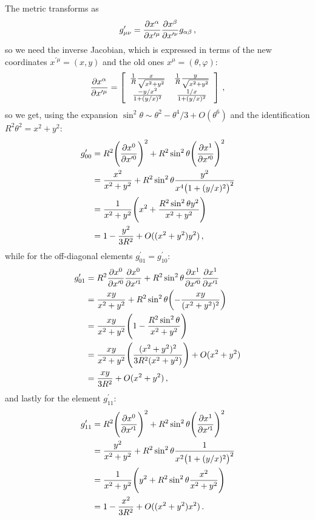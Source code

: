 \documentclass[main.tex]{subfiles}
\begin{document}
The metric transforms as 
%
\begin{align}
  g_{\mu \nu }^{\prime } 
  = \pdv{x^{\alpha }}{x^{\prime \mu }}
  \pdv{x^{\beta }}{x^{\prime  \nu }}
  g_{\alpha \beta }
\,,
\end{align}
%
so we need the inverse Jacobian, which is expressed in terms of the new coordinates \(x^{\prime \mu } = (x, y)\) and the old ones \(x^{\mu } = (\theta , \varphi )\):
%
\begin{align}
  \pdv{x^{\alpha }}{x^{\prime \mu }}
  = \left[\begin{array}{cc}
  \frac{1}{R} \frac{x}{\sqrt{x^2 + y^2}} & 
  \frac{1}{R} \frac{y}{\sqrt{x^2 + y^2}} \\ 
  \frac{-y / x^2}{1 + (y/x)^2} & 
  \frac{1/x}{1 + (y/x)^2}
  \end{array}\right]
\,,
\end{align}
%
so we get, using the expansion \(\sin^2\theta \sim \theta^2 - \theta^{4} /3 + O (\theta^{6})\) and the identification \(R^2\theta^2 = x^2+y^2\):
%
\begin{subequations}
\begin{align}
  g_{00}^{\prime } &= R^2 \qty(\pdv{x^{0}}{x^{\prime 0}})^2
  + R^2 \sin^2 \theta \qty(\pdv{x^{1}}{x^{\prime 0}})^2  \\
  &= \frac{x^2}{x^2+y^2} + R^2 \sin^2 \theta \frac{y^2}{x^{4} \qty(1 + (y/x)^2)^2}  \\
  &=\frac{1}{x^2+y^2} \qty(x^2 + \frac{R^2 \sin^2\theta y^2}{x^2+y^2})  \\
  &= 1 - \frac{y^2}{3R^2} + O((x^2+y^2)y^2)
\,,
\end{align}
\end{subequations}
%
while for the off-diagonal elements \(g_{01}^{\prime } = g_{10}^{\prime }\): 
%
\begin{subequations}
\begin{align}
  g_{01}^{\prime } &= R^2 \pdv{x^{0}}{x^{\prime 0}} \pdv{x^{0}}{x^{\prime 1}} 
  + R^2 \sin^2 \theta \pdv{x^{1}}{x^{\prime 0}} \pdv{x^{1}}{x^{\prime 1}}  \\
  &= \frac{xy}{x^2+y^2} + R^2 \sin^2\theta \qty(- \frac{xy}{(x^2+y^2)^2})  \\
  &= \frac{xy}{x^2+y^2} \qty(1 - \frac{R^2 \sin^2\theta }{x^2+y^2})  \\
  &= \frac{xy}{x^2+y^2} \qty(\frac{(x^2+y^2)^2}{3R^2 (x^2+y^2)}) + O(x^2+y^2) \\
  &= \frac{xy}{3R^2} + O(x^2+y^2)
\,,
\end{align}
\end{subequations}
%
and lastly for the element \(g_{11}^{\prime }\): 
%
\begin{subequations}
\begin{align}
  g_{11}^{\prime } &=  R^2 \qty(\pdv{x^{0}}{x^{\prime 1}})^2
  + R^2 \sin^2 \theta \qty(\pdv{x^{1}}{x^{\prime 1}})^2  \\
  &= \frac{y^2}{x^2+y^2} + R^2 \sin^2 \theta \frac{1}{x^{2} \qty(1 + (y/x)^2)^2}  \\
  &= \frac{1}{x^2+y^2} \qty(y^2 +  R^2 \sin^2\theta \frac{x^2}{x^2+y^2})  \\
  &= 1 - \frac{x^2}{3R^2} + O ((x^2+y^2) x^2)
  \,.
\end{align}
\end{subequations}
\end{document}
